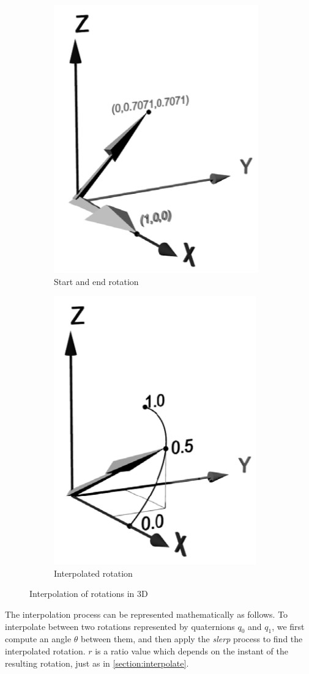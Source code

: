 \begin{figure}[h!]
\centering
\begin{subfigure}{.5\textwidth}
  \centering
  \includegraphics[width=.4\linewidth]{images/3d_start_end_rotations.png}
  \caption{Start and end rotation}
\end{subfigure}%
\begin{subfigure}{.5\textwidth}
  \centering
  \includegraphics[width=.4\linewidth]{images/3d_interpolated_rotation.png}
  \caption{Interpolated rotation}
\end{subfigure}
\caption[Interpolation of rotations in 3D]{Interpolation of rotations in 3D \cite{ISO19141_moving_features}}
\label{fig:3d_interpolation}
\end{figure}

The interpolation process can be represented mathematically as follows. To interpolate between two rotations represented by quaternions \( q_0 \) and \( q_1 \), we first compute an angle \( \theta \) between them, and then apply the \textit{slerp} process to find the interpolated rotation. $r$ is a ratio value which depends on the instant of the resulting rotation, just as in \ref{section:interpolate}.

